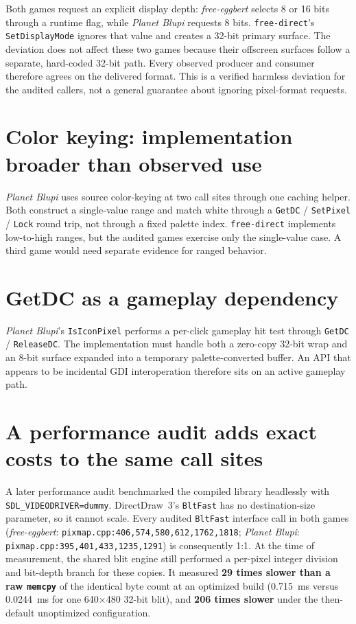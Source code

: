 Both games request an explicit display depth: \emph{free-eggbert} selects 8 or 16 bits through a
runtime flag, while \emph{Planet Blupi} requests 8 bits. \texttt{free-direct}'s
\texttt{SetDisplayMode} ignores that value and creates a 32-bit primary surface. The deviation
does not affect these two games because their offscreen surfaces follow a separate, hard-coded
32-bit path. Every observed producer and consumer therefore agrees on the delivered format.
This is a verified harmless deviation for the audited callers, not a general guarantee about
ignoring pixel-format requests.

\section{Color keying: implementation broader than observed use}

\emph{Planet Blupi} uses source color-keying at two call sites through one caching helper. Both
construct a single-value range and match white through a \texttt{GetDC} / \texttt{SetPixel} /
\texttt{Lock} round trip, not through a fixed palette index. \texttt{free-direct} implements
low-to-high ranges, but the audited games exercise only the single-value case. A third game would
need separate evidence for ranged behavior.

\section{GetDC as a gameplay dependency}

\emph{Planet Blupi}'s \texttt{IsIconPixel} performs a per-click gameplay hit test through
\texttt{GetDC} / \texttt{ReleaseDC}. The implementation must handle both a zero-copy 32-bit wrap
and an 8-bit surface expanded into a temporary palette-converted buffer. An API that appears to
be incidental GDI interoperation therefore sits on an active gameplay path.

\section{A performance audit adds exact costs to the same call sites}

A later performance audit benchmarked the compiled library headlessly with
\texttt{SDL\_VIDEODRIVER=dummy}. DirectDraw~3's \texttt{BltFast} has no destination-size
parameter, so it cannot scale. Every audited \texttt{BltFast} interface call in both games
(\emph{free-eggbert}: \texttt{pixmap.cpp:406,574,580,612,1762,1818}; \emph{Planet Blupi}:
\texttt{pixmap.cpp:395,401,433,1235,1291}) is consequently 1:1. At the time of measurement, the
shared blit engine still performed a per-pixel integer division and bit-depth branch for these
copies. It measured
\textbf{29 times slower than a raw \texttt{memcpy}} of the identical byte count at an optimized
build (0.715~ms versus 0.0244~ms for one 640$\times$480 32-bit blit), and \textbf{206 times slower}
under the then-default unoptimized configuration.

